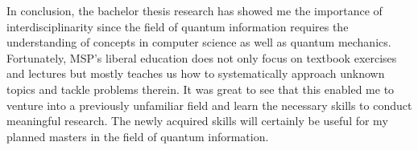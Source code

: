 In conclusion, the bachelor thesis research has showed me the importance of interdisciplinarity since the field of quantum information requires the understanding of concepts in computer science as well as quantum mechanics. Fortunately, MSP's liberal education does not only focus on textbook exercises and lectures but mostly teaches us how to systematically approach unknown topics and tackle problems therein. It was great to see that this enabled me to venture into a previously unfamiliar field and learn the necessary skills to conduct meaningful research. The newly acquired skills will certainly be useful for my planned masters in the field of quantum information.


